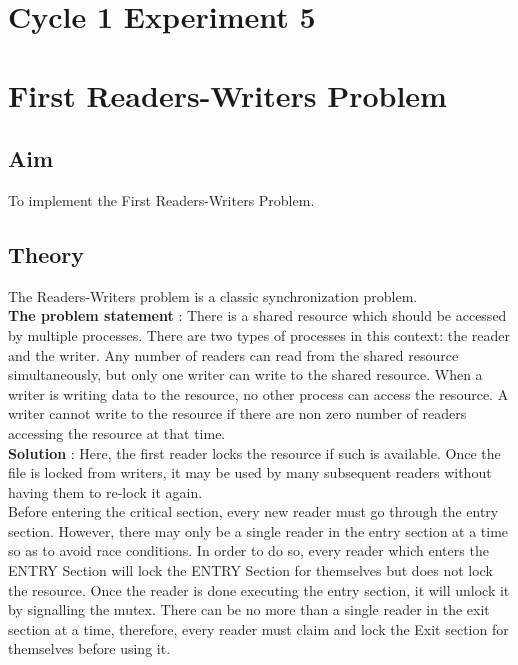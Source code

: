 \section*{Cycle 1 Experiment 5 }

\section{\Large{First Readers-Writers Problem}}

\subsection{Aim}
\large To implement the First Readers-Writers Problem.

\subsection{Theory}
The Readers-Writers problem is a classic synchronization problem.\\

\textbf{The problem statement }: There is a shared resource which should be accessed by
multiple processes. There are two types of processes in this context: the reader and
the writer. Any number of readers can read from the shared resource simultaneously,
but only one writer can write to the shared resource. When a writer is writing data
to the resource, no other process can access the resource. A writer cannot write to
the resource if there are non zero number of readers accessing the resource at that
time.\\


\textbf{Solution }: Here, the first reader locks the resource if such is available. Once the file
is locked from writers, it may be used by many subsequent readers without having
them to re-lock it again.\\

Before entering the critical section, every new reader must go through the entry section. However, there may only be a single reader in the entry section at a time so as to avoid race conditions. In order to do so, every reader which enters the ENTRY Section will lock the ENTRY Section for themselves but does not lock the resource. Once the reader is done executing the entry section, it will unlock it by signalling the mutex. There can be no more than a single reader in the exit section at a time, therefore, every reader must claim and lock the Exit section for themselves before using it.\\

